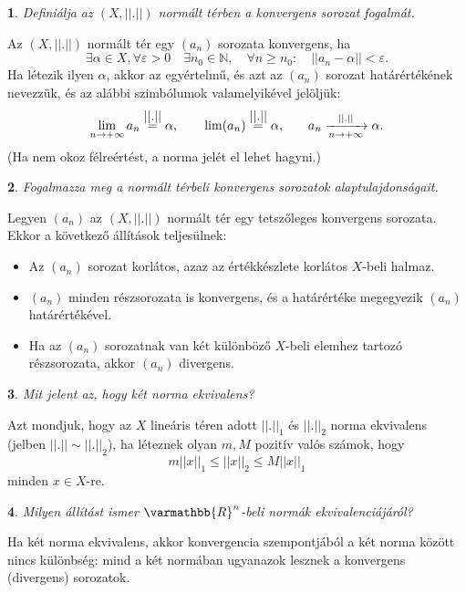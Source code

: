\documentclass[a4paper]{article}
\def\N{\mathbb{N}}
\def\RR{\varmathbb{R}}
\theoremstyle{qstyle}
\newtheorem{question}{}{}
\begin{document}
	\begin{question}
		Definiálja az $(X, ||.||)$ normált térben a konvergens sorozat fogalmát.
	\end{question}
	Az $(X, ||.||)$ normált tér egy $(a_{n})$ sorozata konvergens, ha 
	$$\exists \alpha \in X, \forall \varepsilon > 0 \quad \exists n_{0} \in \N, \quad \forall n \ge n_{0}: \quad ||a_{n} - \alpha|| < \varepsilon \text{.}$$
	Ha létezik ilyen $\alpha$, akkor az egyértelmű, és azt az $(a_{n})$ sorozat határértékének nevezzük, és az alábbi szimbólumok valamelyikével jelöljük:
	$$\lim\limits_{n \to +\infty} a_{n} \stackrel{\hbox{$||.||$}}{\hbox{=}} \alpha \text{,} \quad\quad \lim(a_{n}) \stackrel{\hbox{$||.||$}}{\hbox{=}} \alpha \text{,} \quad\quad a_{n} \xrightarrow[n \to +\infty]{||.||} \alpha \text{.}$$
	(Ha nem okoz félreértést, a norma jelét el lehet hagyni.)
	
	\begin{question}
		Fogalmazza meg a normált térbeli konvergens sorozatok alaptulajdonságait.   
	\end{question}
	Legyen $(a_{n})$ az $(X,||.||)$ normált tér egy tetszőleges konvergens sorozata. Ekkor a következő állítások teljesülnek:
	\begin{itemize}
		\item Az $(a_{n})$ sorozat korlátos, azaz az értékkészlete korlátos $X$-beli halmaz.
		\item $(a_{n})$ minden részsorozata is konvergens, és a határértéke megegyezik $(a_{n})$ határértékével.
		\item Ha az $(a_{n})$ sorozatnak van két különböző $X$-beli elemhez tartozó részsorozata, akkor $(a_{n})$ divergens.
	\end{itemize}
	
	\begin{question}
		Mit jelent az, hogy két norma ekvivalens?   
	\end{question}
	Azt mondjuk, hogy az $X$ lineáris téren adott $||.||_{1}$ és $||.||_{2}$ norma ekvivalens (jelben $||.|| \sim ||.||_{2}$), ha léteznek olyan $m,M$ pozitív valós számok, hogy
	$$m||x||_{1} \le ||x||_{2} \le M||x||_{1}$$
	minden $x \in X$-re.
	
	\begin{question}
		Milyen állítást ismer $\RR^n$-beli normák ekvivalenciájáról?    
	\end{question}
	Ha két norma ekvivalens, akkor konvergencia szempontjából a két norma között nincs különbség: mind a két normában ugyanazok lesznek a konvergens (divergens) sorozatok.
	
\end{document}

